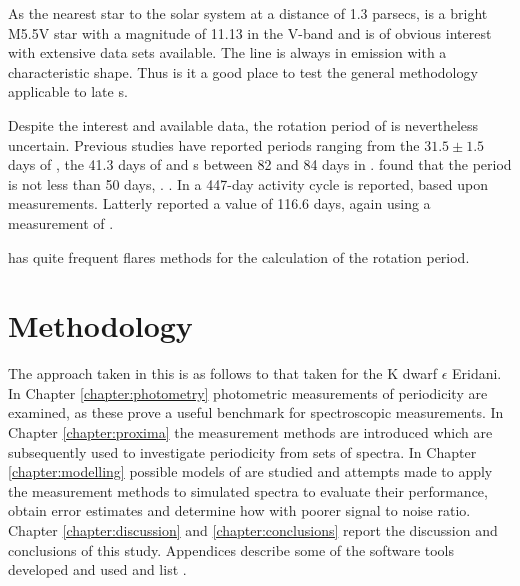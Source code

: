 As the nearest star to the solar system at a distance of 1.3 parsecs, {\prox} is a bright M5.5V star with a magnitude of
11.13 in the V-band and is of obvious interest with extensive data sets available. The {\ha} line is always in emission
with a characteristic shape. Thus is it a good place to test the general methodology applicable to late \rdwarf s.


Despite the interest and available data, the rotation period of {\prox} is nevertheless uncertain.  Previous studies
have reported periods ranging from the $ 31.5 \pm 1.5 $ days of \citet{guinan96}, the 41.3 days of \citet{benedict93}
and s between 82 and 84 days in \citealt{benedict92,benedict98}.  \citet{kurster99} found that the period is not less
than 50 days, . .  In \citet{cincunegui07} a 447-day activity cycle is reported,
based upon {\ha} measurements. Latterly \citet[Table 3]{suarezmascareno15} reported a value of 116.6 days, again using a
measurement of {\ha}.

{\prox} has quite frequent flares  methods for the calculation of the rotation period.

\section{Methodology}
\protect\label{section:methodology}

The approach taken in this {\paperorthesis} is as follows  to that taken 
\citet{giguere16} for the K dwarf $\epsilon$ Eridani. In Chapter \ref{chapter:photometry} photometric measurements of
 periodicity  {\prox} are examined, as these prove a useful benchmark for
spectroscopic measurements. In Chapter \ref{chapter:proxima} the measurement methods are introduced which are
subsequently used to investigate periodicity from sets of spectra. In Chapter \ref{chapter:modelling} possible models of
{\prox} are studied and attempts  made to apply the measurement methods to simulated spectra to evaluate their
performance, obtain error estimates and determine how  with poorer signal to noise ratio. Chapter
\ref{chapter:discussion} and \ref{chapter:conclusions} report the discussion and conclusions of this study. Appendices
describe some of the software tools developed and used and list .
